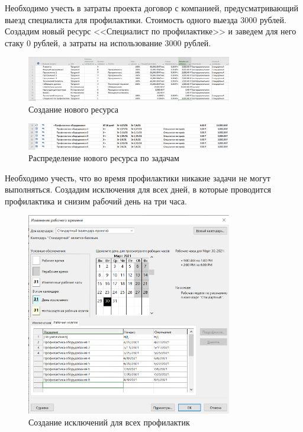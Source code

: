 Необходимо учесть в затраты проекта договор с компанией, предусматривающий выезд специалиста для профилактики. Стоимость одного выезда 3000 рублей. Создадим новый ресурс <<Специалист по профилактике>> и заведем для него стаку 0 рублей, а затраты на использование 3000 рублей.

\begin{figure}[H]
    \centering
    \includegraphics[width=0.8\textwidth]{img/content/task_08_2_1.png}
    \caption{Создание нового ресурса}
    \label{fig:task_08_2_1}
\end{figure}

\begin{figure}[H]
    \centering
    \includegraphics[width=0.8\textwidth]{img/content/task_08_2_2.png}
    \caption{Распределение нового ресурса по задачам}
    \label{fig:task_08_2_2}
\end{figure}

Необходимо учесть, что во время профилактики никакие задачи не могут выполняться. Создадим исключения для всех дней, в которые проводится профилактика и снизим рабочий день на три часа.

\begin{figure}[H]
    \centering
    \includegraphics[width=0.8\textwidth]{img/content/task_08_3_1.png}
    \caption{Создание исключений для всех профилактик}
    \label{fig:task_08_3_1}
\end{figure}

